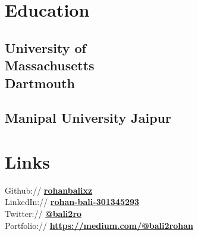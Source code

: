 \documentclass[]{deedy-resume-openfont}
\begin{document}
%
%

%
%

%
%

\begin{minipage}[t]{0.33\textwidth} 


\section{Education} 

\subsection{University of \\Massachusetts \\Dartmouth}
\sectionsep

\subsection{Manipal University Jaipur}
\sectionsep



\section{Links} 
Github:// \href{https://github.com/rohanbalixz}{\bf rohanbalixz} \\
LinkedIn://  \href{https://www.linkedin.com/in/rohan-bali-301345293}{\bf rohan-bali-301345293} \\
Twitter://  \href{https://twitter.com/bali2ro}{\bf @bali2ro} \\
Portfolio://  \href{https://medium.com/@bali2rohan}{\bf https://medium.com/@bali2rohan}


\end{minipage}
\end{document}
